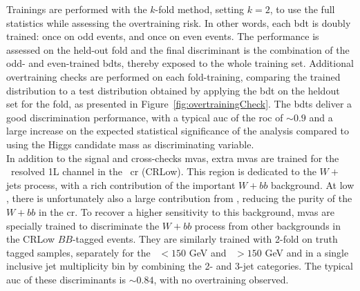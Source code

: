 Trainings are performed with the $k$-fold method, setting $k = 2$, to use the full statistics while assessing the overtraining risk. In other words, each \gls{bdt} is doubly trained: once on odd events, and once on even events. The performance is assessed on the held-out fold and the final discriminant is the combination of the odd- and even-trained \glspl{bdt}, thereby exposed to the whole training set. Additional overtraining checks are performed on each fold-training, comparing the trained distribution to a test distribution obtained by applying the \gls{bdt} on the heldout set for the fold, as presented in Figure~\ref{fig:overtrainingCheck}. The \glspl{bdt} deliver a good discrimination performance, with a typical \gls{auc} of the \gls{roc} of $\sim0.9$ and a large increase on the expected statistical significance of the analysis compared to using the Higgs candidate mass as discriminating variable. \\
  
In addition to the signal and cross-checks \glspl{mva}, extra \glspl{mva} are trained for the \vhb\ resolved 1L channel in the \lowdr\ \gls{cr} (CRLow). This region is dedicated to the $W+$jets process, with a rich contribution of the important $W+bb$ background. At low \ptv, there is unfortunately also a large contribution from \ttb, reducing the purity of the $W+bb$ in the \gls{cr}. To recover a higher sensitivity to this background, \glspl{mva} are specially trained to discriminate the $W+bb$ process from other backgrounds in the CRLow $BB$-tagged events. They are similarly trained with 2-fold on truth tagged samples, separately for the \ptv\ $< 150$ GeV and \ptv\ $> 150$ GeV and in a single inclusive jet multiplicity bin by combining the 2- and 3-jet categories. The typical \gls{auc} of these discriminants is $\sim0.84$, with no overtraining observed.

